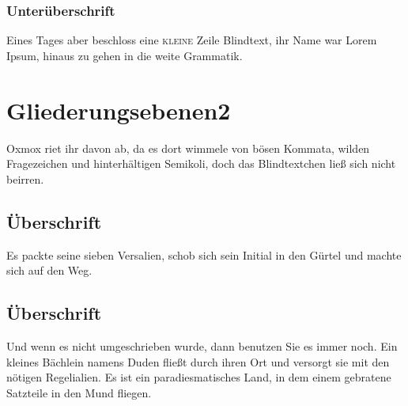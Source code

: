 \documentclass[%
	12pt,%
	a4paper,%
	oneside,%
	listof=totoc,
 	index=totoc,
	bibliography = totoc,
	parskip = half,%
	chapterprefix=false,%
	appendixprefix, %
	headings=small,%
]{scrreprt}
\begin{document}
\subsection{Unterüberschrift}

Eines Tages aber beschloss eine \textsc{kleine} Zeile Blindtext, ihr Name war Lorem Ipsum, hinaus zu gehen in die weite Grammatik.

\chapter{Gliederungsebenen2}
\label{sec:Gliederung2}

Oxmox riet ihr davon ab, da es dort wimmele von bösen Kommata, wilden Fragezeichen und hinterhältigen Semikoli, doch das Blindtextchen ließ sich nicht beirren.

\section{Überschrift}

Es packte seine sieben Versalien, schob sich sein Initial in den Gürtel und machte sich auf den Weg.

%
%

\section{Überschrift}
Und wenn es nicht umgeschrieben wurde, dann benutzen Sie es immer noch. Ein kleines Bächlein namens Duden fließt durch ihren Ort und versorgt sie mit den nötigen Regelialien. Es ist ein paradiesmatisches Land, in dem einem gebratene Satzteile in den Mund fliegen.
\end{document}
